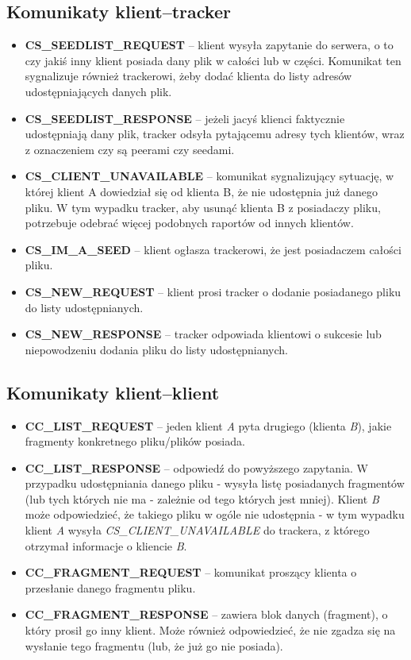 \documentclass[11pt]{article}
\begin{document}
\subsection{Komunikaty klient--tracker}
\begin{itemize}
\item \textbf{CS\_SEEDLIST\_REQUEST} -- klient wysyła zapytanie do serwera, o to czy jakiś inny klient posiada dany plik w całości lub w części. Komunikat ten sygnalizuje również trackerowi, żeby dodać klienta do listy adresów udostępniających danych plik.
\item \textbf{CS\_SEEDLIST\_RESPONSE} -- jeżeli jacyś klienci faktycznie udostępniają dany plik, tracker odsyła pytającemu adresy tych klientów, wraz z oznaczeniem czy są peerami czy seedami.
\item \textbf{CS\_CLIENT\_UNAVAILABLE} -- komunikat sygnalizujący sytuację, w której klient A dowiedział się od klienta B, że nie udostępnia już danego pliku. W tym wypadku tracker, aby usunąć klienta B z posiadaczy pliku, potrzebuje odebrać więcej podobnych raportów od innych klientów.
\item \textbf{CS\_IM\_A\_SEED} -- klient ogłasza trackerowi, że jest posiadaczem całości pliku.
\item \textbf{CS\_NEW\_REQUEST} -- klient prosi tracker o dodanie posiadanego pliku do listy udostępnianych.
\item \textbf{CS\_NEW\_RESPONSE} -- tracker odpowiada klientowi o sukcesie lub niepowodzeniu dodania pliku do listy udostępnianych.
\end{itemize}

\subsection{Komunikaty klient--klient}
\begin{itemize}
\item \textbf{CC\_LIST\_REQUEST} -- jeden klient \textsl{A} pyta drugiego (klienta \textsl{B}), jakie fragmenty konkretnego pliku/plików posiada.
\item \textbf{CC\_LIST\_RESPONSE} -- odpowiedź do powyższego zapytania. W przypadku udostępniania danego pliku - wysyła listę posiadanych fragmentów (lub tych których nie ma - zależnie od tego których jest mniej). Klient \textsl{B} może odpowiedzieć, że takiego pliku w ogóle nie udostępnia - w tym wypadku klient \textsl{A} wysyła \textsl{CS\_CLIENT\_UNAVAILABLE} do trackera, z którego otrzymał informacje o kliencie \textsl{B}.
\item \textbf{CC\_FRAGMENT\_REQUEST} -- komunikat proszący klienta o przesłanie danego fragmentu pliku.
\item \textbf{CC\_FRAGMENT\_RESPONSE} -- zawiera blok danych (fragment), o który prosił go inny klient. Może również odpowiedzieć, że nie zgadza się na wysłanie tego fragmentu (lub, że już go nie posiada).
\end{itemize}
\end{document}
